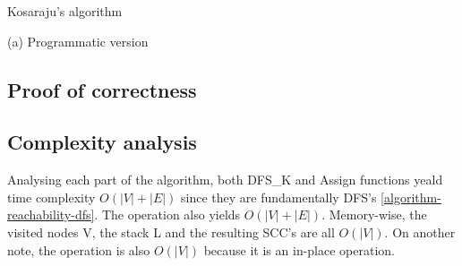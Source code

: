 \begin{center}
    \begin{algorithm}
        \caption{Kosaraju's algorithm}
        \label{alg-kosaraju}
        \begin{minipage}[t]{0.49\linewidth}
            (a) Programmatic version
            \begin{algorithmic}[1]
                     {\Return{}}
                    \EndIf
                    \EndFor
                \EndFunction

                     {\Return{}}
                    \EndIf
                    \For{$v : Adj[u]]$}
                    \EndFor
                \EndFunction

                 {}
                \EndFor
                    \State {}
                \EndWhile
                \State {}
                \EndFunction
            \end{algorithmic}
        \end{minipage}
    \end{algorithm}
\end{center}
\subsection{Proof of correctness}

\subsection{Complexity analysis}
Analysing each part of the algorithm, both DFS\_K and Assign functions yeald time complexity $O(|V|+|E|)$ since they are fundamentally DFS's \ref{algorithm-reachability-dfs}. The  operation also yields $O(|V|+|E|)$.
Memory-wise, the visited nodes V, the stack L and the resulting SCC's are all $O(|V|)$. On another note, the  operation is also $O(|V|)$ because it is an in-place operation.



